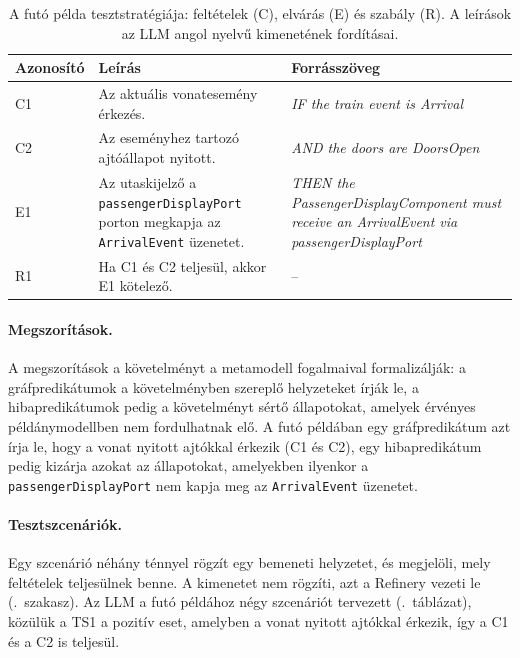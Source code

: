 \begin{table}[!ht]
	\footnotesize
	\centering
	\begin{tabular}{l >{\raggedright\arraybackslash}p{} >{\raggedright\arraybackslash}p{}}
		\toprule
		Azonosító & Leírás & Forrásszöveg \\
		\midrule
		C1 & Az aktuális vonatesemény érkezés. & \emph{IF the train event is Arrival} \\
		C2 & Az eseményhez tartozó ajtóállapot nyitott. & \emph{AND the doors are DoorsOpen} \\
		E1 & Az utaskijelző a \texttt{passengerDisplayPort} porton megkapja az \texttt{ArrivalEvent} üzenetet. & \emph{THEN the PassengerDisplayComponent must receive an ArrivalEvent via passengerDisplayPort} \\
		R1 & Ha C1 és C2 teljesül, akkor E1 kötelező. & -- \\
		\bottomrule
	\end{tabular}
	\caption{A futó példa tesztstratégiája: feltételek (C), elvárás (E) és szabály (R). A leírások az LLM angol nyelvű kimenetének fordításai.}
	\label{tab:overview-strategy}
\end{table}

\paragraph{Megszorítások.} A megszorítások a követelményt a metamodell fogalmaival formalizálják: a gráfpredikátumok a követelményben szereplő helyzeteket írják le, a hibapredikátumok pedig a követelményt sértő állapotokat, amelyek érvényes példánymodellben nem fordulhatnak elő. A futó példában egy gráfpredikátum azt írja le, hogy a vonat nyitott ajtókkal érkezik (C1 és C2), egy hibapredikátum pedig kizárja azokat az állapotokat, amelyekben ilyenkor a \texttt{passengerDisplayPort} nem kapja meg az \texttt{ArrivalEvent} üzenetet.

\paragraph{Tesztszcenáriók.} Egy szcenárió néhány ténnyel rögzít egy bemeneti helyzetet, és megjelöli, mely feltételek teljesülnek benne. A kimenetet nem rögzíti, azt a Refinery vezeti le (.~szakasz). Az LLM a futó példához négy szcenáriót tervezett (.~táblázat), közülük a TS1 a pozitív eset, amelyben a vonat nyitott ajtókkal érkezik, így a C1 és a C2 is teljesül.


